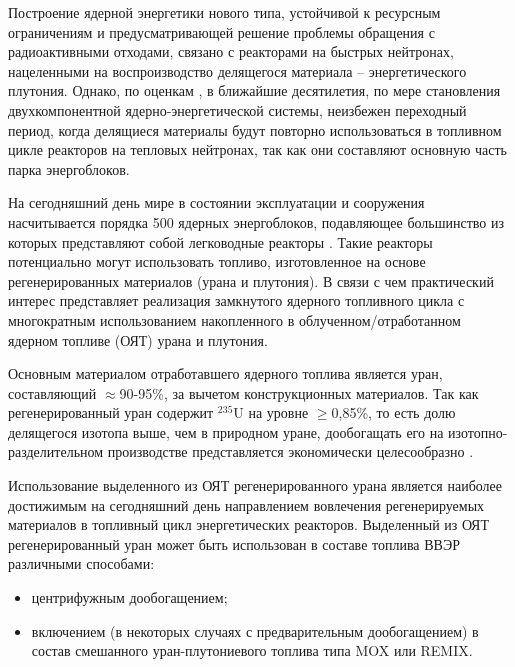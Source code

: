 {\actuality}
Построение ядерной энергетики нового типа, устойчивой к ресурсным ограничениям и предусматривающей решение проблемы обращения с радиоактивными отходами, связано с реакторами на быстрых нейтронах, нацеленными на воспроизводство делящегося материала -- энергетического  плутония. Однако, по оценкам \cite{andrianovaPerspektivnyeToplivnyeZagruzki2015}, в ближайшие десятилетия, по мере становления двухкомпонентной ядерно-энергетической системы, неизбежен переходный период, когда делящиеся материалы будут повторно использоваться в топливном цикле реакторов на тепловых нейтронах, так как они составляют основную часть парка энергоблоков.


На сегодняшний день мире в состоянии эксплуатации и сооружения насчитывается порядка 500 ядерных энергоблоков, подавляющее большинство из которых представляют собой легководные реакторы \cite{PRISHome}. Такие реакторы потенциально могут использовать топливо, изготовленное на основе регенерированных материалов (урана и плутония). В связи с чем практический интерес представляет реализация замкнутого ядерного топливного цикла с многократным использованием накопленного в облученном/отработанном ядерном топливе (ОЯТ) урана и плутония.

Основным материалом отработавшего ядерного топлива является уран, составляющий $\approx$90-95\%, за вычетом конструкционных материалов. Так как регенерированный уран содержит $^{235}$U на уровне $\geq$0,85\%, то есть долю делящегося изотопа выше, чем в природном уране, дообогащать его на изотопно-разделительном производстве представляется экономически целесообразно \cite{NikipelovNikipelovSudby}.

Использование выделенного из ОЯТ регенерированного урана является наиболее достижимым на сегодняшний день направлением вовлечения регенерируемых материалов в топливный цикл энергетических реакторов. Выделенный из ОЯТ регенерированный уран может быть использован в составе топлива ВВЭР различными способами:
\begin{itemize}
  \item центрифужным дообогащением;
  \item включением (в некоторых случаях с предварительным дообогащением) в состав смешанного уран-плутониевого топлива типа MOX или REMIX.
\end{itemize}
 
